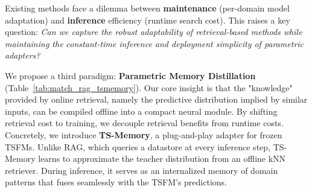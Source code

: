 Existing methods face a dilemma between \textbf{maintenance} (per-domain model adaptation) and \textbf{inference} efficiency (runtime search cost). This raises a key question: \textit{Can we capture the robust adaptability of retrieval-based methods while maintaining the constant-time inference and deployment simplicity of parametric adapters?}




We propose a third paradigm: \textbf{Parametric Memory Distillation} (Table~\ref{tab:match_rag_tsmemory}). Our core insight is that the "knowledge" provided by online retrieval, namely the predictive distribution implied by similar inputs, can be compiled offline into a compact neural module. By shifting retrieval cost to training, we decouple retrieval benefits from runtime costs. Concretely, we introduce \textbf{TS-Memory}, a plug-and-play adapter for frozen TSFMs. Unlike RAG, which queries a datastore at every inference step, TS-Memory learns to approximate the teacher distribution from an offline kNN retriever. During inference, it serves as an internalized memory of domain patterns that fuses seamlessly with the TSFM's predictions.

